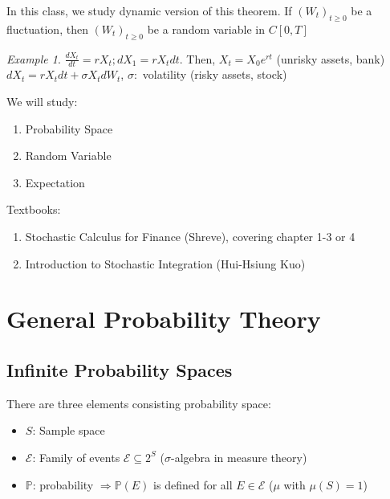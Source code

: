 \documentclass[12pt]{report}
\renewcommand{\1}{\mathbb{1}}
\renewcommand{\subset}{\subseteq}
\newcommand{\RNum}[1]{\uppercase\expandafter{\romannumeral #1\relax}}
\theoremstyle{break}
\theoremstyle{newdef}
\theoremstyle{remark}
\newtheorem*{exmp}{Example} %
\begin{document}
In this class, we study dynamic version of this theorem.
If $(W_t)_{t\geq 0}$ be a fluctuation, then $(W_t)_{t\geq 0}$ be a random variable in $C[0,T]$

\begin{exmp}
$\frac{dX_t}{dt} = rX_t; dX_1 = rX_tdt$. Then, $X_t = X_0 e^{rt}$ (unrisky assets, bank)\\
$dX_t = rX_tdt + \sigma X_tdW_t$, $\sigma:$ volatility (risky assets, stock)
\end{exmp}

We will study:
\begin{enumerate}
\item Probability Space
\item Random Variable
\item Expectation
\end{enumerate}

Textbooks:
\begin{enumerate}
\item Stochastic Calculus for Finance \RNum{2} (Shreve), covering chapter 1-3 or 4
\item Introduction to Stochastic Integration (Hui-Hsiung Kuo)
\end{enumerate}



\chapter{General Probability Theory}
\section{Infinite Probability Spaces}
There are three elements consisting probability space:
\begin{itemize}
\item $S$: Sample space
\item $\mathcal{E}$: Family of events $\mathcal{E} \subset 2^S$ ($\sigma$-algebra in measure theory)
\item $\mathbb{P}$: probability $\Rightarrow \mathbb{P}(E)$ is defined for all $E \in \mathcal{E}$ ($\mu$ with $\mu(S)=1$)
\end{itemize}
\end{document}
